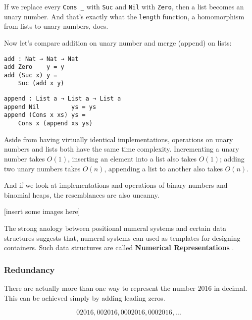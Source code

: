 \documentclass[12pt, a4paper]{article}
\begin{document}
If we replace every {\lstinline|Cons _|} with {\lstinline|Suc|} and {\lstinline|Nil|}
with {\lstinline|Zero|}, then a list becomes an unary number.
And that's exactly what the {\lstinline|length|} function,
a homomorphism from lists to unary numbers, does.

Now let's compare addition on unary number and merge (append) on lists:

\noindent\begin{minipage}{.48\textwidth}
\begin{lstlisting}[basicstyle=\ttfamily\scriptsize]
add : Nat → Nat → Nat
add Zero    y = y
add (Suc x) y =
    Suc (add x y)
\end{lstlisting}
\end{minipage}\hfill
\begin{minipage}{.45\textwidth}
\begin{lstlisting}[basicstyle=\ttfamily\scriptsize]
append : List a → List a → List a
append Nil         ys = ys
append (Cons x xs) ys =
    Cons x (append xs ys)
\end{lstlisting}
\end{minipage}

Aside from having virtually identical implementations, operations on unary numbers
and lists both have the same time complexity. Incrementing a unary number takes
$ O(1) $, inserting an element into a list also takes $ O(1) $; adding two unary
numbers takes $ O(n) $, appending a list to another also takes $ O(n) $.

And if we look at implementations and operations of binary numbers and binomial
heaps, the resemblances are also uncanny.

[insert some images here]

The strong anology between positional numeral systems and certain data structures
suggests that, numeral systems can used as templates for designing containers.
Such data structures are called \textbf{Numerical Representations}\cite{okasaki1996purely}
\cite{hinze1998numerical}.

\subsubsection{Redundancy}

There are actually more than one way to represent the number $ 2016 $ in decimal.
This can be achieved simply by adding leading zeros.

$$
    02016, 002016, 0002016, 0002016, ...
$$
\end{document}
